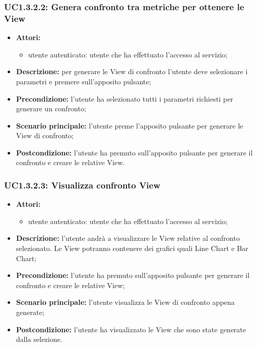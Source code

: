 \subsubsection{UC1.3.2.2: Genera confronto tra metriche per ottenere le View}
\begin{itemize}
	\item \textbf{Attori:}
	\begin{itemize}
		\item utente autenticato: utente che ha effettuato l'accesso al servizio;
	\end{itemize}
	\item \textbf{Descrizione:} per generare le View di confronto l'utente deve selezionare i parametri e premere sull'apposito pulsante;
	\item \textbf{Precondizione:} l'utente ha selezionato tutti i parametri richiesti per generare un confronto;
	\item \textbf{Scenario principale:} l'utente preme l'apposito pulsante per generare le View di confronto;
	\item \textbf{Postcondizione:} l'utente ha premuto sull'apposito pulsante per generare il confronto e creare le relative View.
\end{itemize}

\subsubsection{UC1.3.2.3: Visualizza confronto View}
\begin{itemize}
	\item \textbf{Attori:}
	\begin{itemize}
		\item utente autenticato: utente che ha effettuato l'accesso al servizio;
	\end{itemize}
	\item \textbf{Descrizione:} l'utente andrà a visualizzare le View relative al confronto selezionato. Le View potranno contenere dei grafici quali Line Chart e Bar Chart;
	\item \textbf{Precondizione:} l'utente ha premuto sull'apposito pulsante per generare il confronto e creare le relative View;
	\item \textbf{Scenario principale:} l'utente visualizza le View di confronto appena generate;
	\item \textbf{Postcondizione:} l'utente ha visualizzato le View che sono state generate dalla selezione.
\end{itemize}

